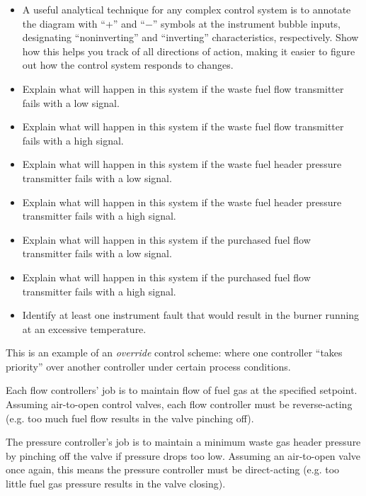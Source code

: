 \begin{itemize}
\item{} A useful analytical technique for any complex control system is to annotate the diagram with ``+'' and ``$-$'' symbols at the instrument bubble inputs, designating ``noninverting'' and ``inverting'' characteristics, respectively.  Show how this helps you track of all directions of action, making it easier to figure out how the control system responds to changes.
\item{} Explain what will happen in this system if the waste fuel flow transmitter fails with a low signal.
\item{} Explain what will happen in this system if the waste fuel flow transmitter fails with a high signal.
\item{} Explain what will happen in this system if the waste fuel header pressure transmitter fails with a low signal.
\item{} Explain what will happen in this system if the waste fuel header pressure transmitter fails with a high signal.
\item{} Explain what will happen in this system if the purchased fuel flow transmitter fails with a low signal.
\item{} Explain what will happen in this system if the purchased fuel flow transmitter fails with a high signal.
\item{} Identify at least one instrument fault that would result in the burner running at an excessive temperature.
\end{itemize}







This is an example of an {\it override} control scheme: where one controller ``takes priority'' over another controller under certain process conditions.







Each flow controllers' job is to maintain flow of fuel gas at the specified setpoint.  Assuming air-to-open control valves, each flow controller must be reverse-acting (e.g. too much fuel flow results in the valve pinching off). 

The pressure controller's job is to maintain a minimum waste gas header pressure by pinching off the valve if pressure drops too low.  Assuming an air-to-open valve once again, this means the pressure controller must be direct-acting (e.g. too little fuel gas pressure results in the valve closing).

